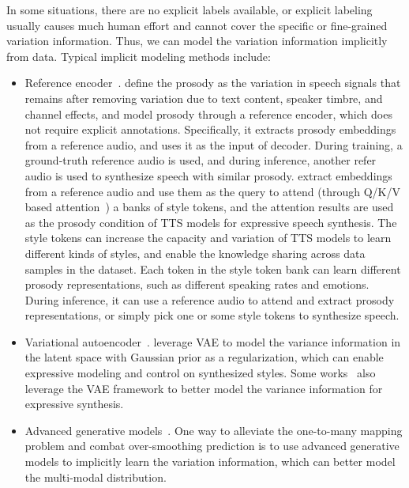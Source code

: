 \documentclass{article}
\begin{document}
In some situations, there are no explicit labels available, or explicit labeling usually causes much human effort and cannot cover the specific or fine-grained variation information. Thus, we can model the variation information implicitly from data. Typical implicit modeling methods include: 
\begin{itemize}[leftmargin=*]
\item Reference encoder~\cite{skerry2018towards,wang2018style,ma2018neural,jia2018transfer,arik2018neural,choi2020attentron,chen2021adaspeech,gururani2019prosody}. \citet{skerry2018towards} define the prosody as the variation in speech signals that remains after removing variation due to text content, speaker timbre, and channel effects, and model prosody through a reference encoder, which does not require explicit annotations. Specifically, it extracts prosody embeddings from a reference audio, and uses it as the input of decoder. During training, a ground-truth reference audio is used, and during inference, another refer audio is used to synthesize speech with similar prosody. \citet{wang2018style} extract embeddings from a reference audio and use them as the query to attend (through Q/K/V based attention~\cite{vaswani2017attention}) a banks of style tokens, and the attention results are used as the prosody condition of TTS models for expressive speech synthesis. The style tokens can increase the capacity and variation of TTS models to learn different kinds of styles, and enable the knowledge sharing across data samples in the dataset. Each token in the style token bank can learn different prosody representations, such as different speaking rates and emotions. During inference, it can use a reference audio to attend and extract prosody representations, or simply pick one or some style tokens to synthesize speech. 

\item Variational autoencoder~\cite{hsu2018hierarchical,akuzawa2018expressive,zhang2019learningb,hsu2019disentangling,habib2019semi,sun2020generating,sun2020fully,elias2020parallel}. \citet{zhang2019learningb} leverage VAE to model the variance information in the latent space with Gaussian prior as a regularization, which can enable expressive modeling and control on synthesized styles. Some works~\cite{akuzawa2018expressive,hsu2019disentangling,aggarwal2020using,elias2020parallel} also leverage the VAE framework to better model the variance information for expressive synthesis. 

\item Advanced generative models~\cite{ma2018neural,lee2020multi,valle2020flowtron,miao2020flow,kim2020glow,du2021mixture,jeong2021diff,lee2021priorgrad}. One way to alleviate the one-to-many mapping problem and combat over-smoothing prediction is to use advanced generative models to implicitly learn the variation information, which can better model the multi-modal distribution. 


\end{itemize}
\end{document}
